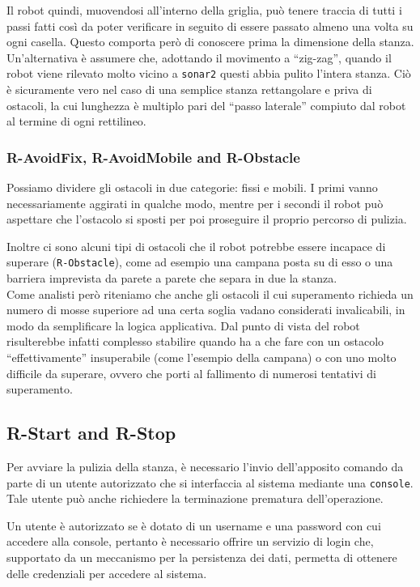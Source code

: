 \documentclass{../llncs}
\newcommand{\code}[1]{{\color{blue}\small{\texttt{#1}}}}
\begin{document}
Il robot quindi, muovendosi all'interno della griglia, può tenere traccia di tutti i passi fatti così da poter verificare in seguito di essere passato almeno una volta su ogni casella. Questo comporta però di conoscere prima la dimensione della stanza.\\

Un'alternativa è assumere che, adottando il movimento a ``zig-zag'', quando il robot viene rilevato molto vicino a \code{sonar2} questi abbia pulito l'intera stanza. Ciò è sicuramente vero nel caso di una semplice stanza rettangolare e priva di ostacoli, la cui lunghezza è multiplo pari del ``passo laterale'' compiuto dal robot al termine di ogni rettilineo.

\subsubsection{R-AvoidFix, R-AvoidMobile and R-Obstacle}
Possiamo dividere gli ostacoli in due categorie: fissi e mobili. I primi vanno necessariamente aggirati in qualche modo, mentre per i secondi il robot può aspettare che l'ostacolo si sposti per poi proseguire il proprio percorso di pulizia.

Inoltre ci sono alcuni tipi di ostacoli che il robot potrebbe essere incapace di superare (\code{R-Obstacle}), come ad esempio una campana posta su di esso o una barriera imprevista da parete a parete che separa in due la stanza.\\

Come analisti però riteniamo che anche gli ostacoli il cui superamento richieda un numero di mosse superiore ad una certa soglia vadano considerati invalicabili, in modo da semplificare la logica applicativa. Dal punto di vista del robot risulterebbe infatti complesso stabilire quando ha a che fare con un ostacolo ``effettivamente'' insuperabile (come l'esempio della campana) o con uno molto difficile da superare, ovvero che porti al fallimento di numerosi tentativi di superamento.

\subsection{R-Start and R-Stop}
Per avviare la pulizia della stanza, è necessario l'invio dell'apposito comando da parte di un utente autorizzato che si interfaccia al sistema mediante una \code{console}. Tale utente può anche richiedere la terminazione prematura dell'operazione.

Un utente è autorizzato se è dotato di un username e una password con cui accedere alla console, pertanto è necessario offrire un servizio di login che, supportato da un meccanismo per la persistenza dei dati, permetta di ottenere delle credenziali per accedere al sistema.\\
\end{document}
